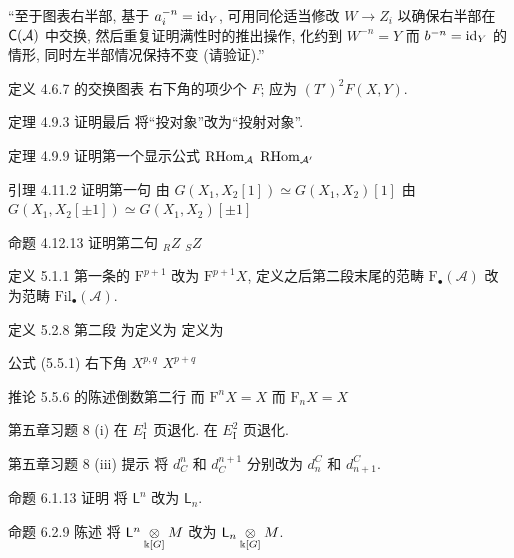 \documentclass{AJerrata}
\begin{document}
\begin{Errata}
		``至于图表右半部, 基于 $a_i^{-n} = \mathrm{id}_Y$, 可用同伦适当修改 $W \to Z_i$ 以确保右半部在 $\mathsf{C}(\mathcal{A})$ 中交换, 然后重复证明满性时的推出操作, 化约到 $W^{-n} = Y$ 而 $b^{-n} = \mathrm{id}_Y$ 的情形, 同时左半部情况保持不变 (请验证).''
		
		\item[定义 4.6.7 的交换图表]
		右下角的项少个 $F$; 应为 $(T')^2 F(X, Y)$.
		
		\item[定理 4.9.3 证明最后]
		将``投对象''改为``投射对象''.
		
		\item[定理 4.9.9 证明第一个显示公式]
		\Orig $\operatorname{RHom}_{\mathcal{A}}$
		\Corr $\operatorname{RHom}_{\mathcal{A}'}$
		
		\item[引理 4.11.2 证明第一句]
		\Orig 由 $G(X_1, X_2[1]) \simeq G(X_1, X_2)[1]$
		\Corr 由 $G(X_1, X_2[\pm 1]) \simeq G(X_1, X_2)[\pm 1]$
		
		\item[命题 4.12.13 证明第二句]
		\Orig ${}_R Z$
		\Corr ${}_S Z$
		
		\item[定义 5.1.1]
		第一条的 $\mathrm{F}^{p+1}$ 改为 $\mathrm{F}^{p+1} X$, 定义之后第二段末尾的范畴 $\mathrm{F}_{\bullet}(\mathcal{A})$ 改为范畴 $\mathrm{Fil}_{\bullet}(\mathcal{A})$.
		
		\item[定义 5.2.8 第二段]
		\Orig 为定义为
		\Corr 定义为

		\item[公式 (5.5.1) 右下角]
		\Orig $X^{p, q}$
		\Corr $X^{p+q}$
		
		\item[推论 5.5.6 的陈述倒数第二行]
		\Orig 而 $\mathrm{F}^n X = X$
		\Corr 而 $\mathrm{F}_n X = X$
		
		\item[第五章习题 8 (i)]
		\Orig 在 $E_{\mathrm{I}}^1$ 页退化.
		\Corr 在 $E_{\mathrm{I}}^2$ 页退化.
		
		\item[第五章习题 8 (iii) 提示]
		将 $d_C^n$ 和 $d_C^{n+1}$ 分别改为 $d^C_n$ 和 $d^C_{n+1}$.
		
		\item[命题 6.1.13 证明]
		将 $\mathsf{L}^n$ 改为 $\mathsf{L}_n$.
		
		\item[命题 6.2.9 陈述]
		将 $\mathsf{L}^n \underset{\Bbbk[G]}{\otimes} M$ 改为 $\mathsf{L}_n \underset{\Bbbk[G]}{\otimes} M$.
		

\end{Errata}
\end{document}
